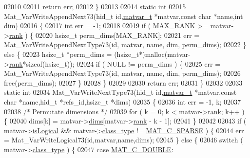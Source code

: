 \begin{DoxyCode}
{{{{{{02010 
02011     \textcolor{keywordflow}{return} err;
02012 \}
02013 
02014 \textcolor{keyword}{static} \textcolor{keywordtype}{int}
02015 Mat\_VarWriteAppendNext73(hid\_t \textcolor{keywordtype}{id},\hyperlink{group___m_a_t_structmatvar__t}{matvar\_t} *matvar,\textcolor{keyword}{const} \textcolor{keywordtype}{char} *name,\textcolor{keywordtype}{int} dim)
02016 \{
02017     \textcolor{keywordtype}{int} err = -1;
02018 
02019     \textcolor{keywordflow}{if} ( MAX\_RANK >= matvar->\hyperlink{group___m_a_t_a84ba70c96ded13cc555fa75b768d9921}{rank} ) \{
02020         hsize\_t perm\_dims[MAX\_RANK];
02021         err = Mat\_VarWriteAppendNextType73(\textcolor{keywordtype}{id}, matvar, name, dim, perm\_dims);
02022     \} \textcolor{keywordflow}{else} \{
02023         hsize\_t *perm\_dims = (hsize\_t*)malloc(matvar->\hyperlink{group___m_a_t_a84ba70c96ded13cc555fa75b768d9921}{rank}*\textcolor{keyword}{sizeof}(hsize\_t));
02024         \textcolor{keywordflow}{if} ( NULL != perm\_dims ) \{
02025             err = Mat\_VarWriteAppendNextType73(\textcolor{keywordtype}{id}, matvar, name, dim, perm\_dims);
02026             free(perm\_dims);
02027         \}
02028     \}
02029 
02030     \textcolor{keywordflow}{return} err;
02031 \}
02032 
02033 \textcolor{keyword}{static} \textcolor{keywordtype}{int}
02034 Mat\_VarWriteNextType73(hid\_t \textcolor{keywordtype}{id},\hyperlink{group___m_a_t_structmatvar__t}{matvar\_t} *matvar,\textcolor{keyword}{const} \textcolor{keywordtype}{char} *name,hid\_t *refs\_id,hsize\_t *dims)
02035 \{
02036     \textcolor{keywordtype}{int} err = -1, k;
02037 
02038     \textcolor{comment}{/* Permutate dimensions */}
02039     \textcolor{keywordflow}{for} ( k = 0; k < matvar->\hyperlink{group___m_a_t_a84ba70c96ded13cc555fa75b768d9921}{rank}; k++ ) \{
02040         dims[k] = matvar->\hyperlink{group___m_a_t_a8e01234e1c862ce3472bb37f5a09b92c}{dims}[matvar->\hyperlink{group___m_a_t_a84ba70c96ded13cc555fa75b768d9921}{rank} - k - 1];
02041     \}
02042 
02043     \textcolor{keywordflow}{if} ( matvar->\hyperlink{group___m_a_t_a866c1539e68073a837833d74cd4a65be}{isLogical} && matvar->\hyperlink{group___m_a_t_aff13035bf3265dd7d9425e5d40c839d4}{class\_type} != 
      \hyperlink{group___m_a_t_ggad4d60ae7b709fc81bfd744fb4c857c40a0d5655b7e6178a2242cb3bb56ff4c8d2}{MAT\_C\_SPARSE} ) \{
02044         err = Mat\_VarWriteLogical73(\textcolor{keywordtype}{id},matvar,name,dims);
02045     \} \textcolor{keywordflow}{else} \{
02046         \textcolor{keywordflow}{switch} ( matvar->\hyperlink{group___m_a_t_aff13035bf3265dd7d9425e5d40c839d4}{class\_type} ) \{
02047             \textcolor{keywordflow}{case} \hyperlink{group___m_a_t_ggad4d60ae7b709fc81bfd744fb4c857c40a5d70e0862e5bdb7bd86bf7ba5948f307}{MAT\_C\_DOUBLE}:
}}}}}}
\end{DoxyCode}

